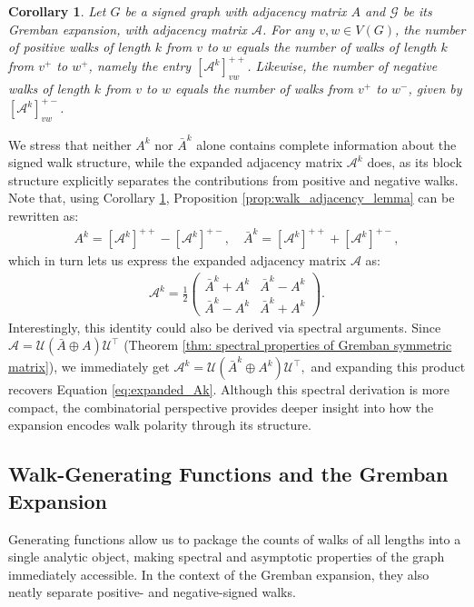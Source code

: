 \documentclass[reprint,onecolumn]{article}
\newtheorem{corollary}[theorem]{Corollary}
\newcommand{\mc}[1]{\mathcal{#1}}
\newcommand{\1}{\mathbb{1}}
\newcommand{\0}{\mathbf{0}}
\begin{document}
\begin{corollary}  \label{cor:walk_adjacency_expanded}
Let $G$ be a signed graph with adjacency matrix $A$ and $\mc G$ be its Gremban expansion, with adjacency matrix $\mc A$. For any \(v,w\in V(G)\), the number of positive walks of length \(k\) from \(v\) to \(w\) equals the number of walks of length \(k\) from \(v^+\) to \(w^+\), namely the entry \([\mc A^k]^{++}_{vw}\). Likewise, the number of negative walks of length \(k\) from \(v\) to \(w\) equals the number of walks from \(v^+\) to \(w^-\), given by \([\mc A^k]^{+-}_{vw}\).
\end{corollary}
We stress that neither $A^k$ nor $\bar A^k$ alone contains complete information about the signed walk structure, while the expanded adjacency matrix $\mc A^k$ does, as its block structure explicitly separates the contributions from positive and negative walks. Note that, using Corollary \ref{cor:walk_adjacency_expanded}, Proposition \ref{prop:walk_adjacency_lemma} can be rewritten as:
\begin{align} \label{eq:Ak_walks}
A^k = [\mc A^k]^{++} - [\mc A^k]^{+-}, \quad \bar A^k = [\mc A^k]^{++} + [\mc A^k]^{+-},
\end{align}
which in turn lets us express the expanded adjacency matrix $\mc A$ as: 
\begin{align} \label{eq:expanded_Ak}
    \mc A^k = \frac{1}{2}
    \begin{pmatrix}
        \bar A^k + A^k & \bar A^k - A^k \\
        \bar A^k - A^k & \bar A^k + A^k
    \end{pmatrix}.
\end{align}
Interestingly, this identity could also be derived via spectral arguments. Since \( \mc A = \mc U(\bar A \oplus A) \mc U^\top \) (Theorem \ref{thm: spectral properties of Gremban symmetric matrix}), we immediately get $\mc A^k = \mc U(\bar A^k \oplus A^k) \mc U^\top,
$ and expanding this product recovers Equation \eqref{eq:expanded_Ak}. Although this spectral derivation is more compact, the combinatorial perspective provides deeper insight into how the expansion encodes walk polarity through its structure.
%
\subsection{Walk-Generating Functions and the Gremban Expansion}  \label{app:walk_generating_functions}

Generating functions allow us to package the counts of walks of all lengths into a single analytic object, making spectral and asymptotic properties of the graph immediately accessible.  In the context of the Gremban expansion, they also neatly separate positive- and negative-signed walks.
\end{document}
